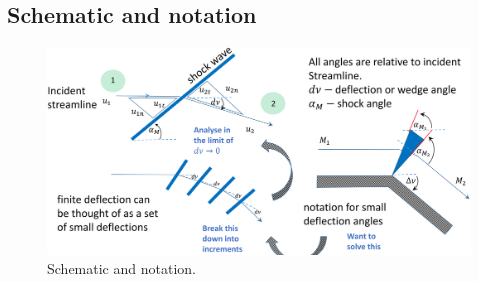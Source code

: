 \subsection{Schematic and notation}
\begin{figure}[H]
    \centering
    \includegraphics[width = \textwidth]{./img/diagram24.png}
    \caption{Schematic and notation.}
\end{figure}
